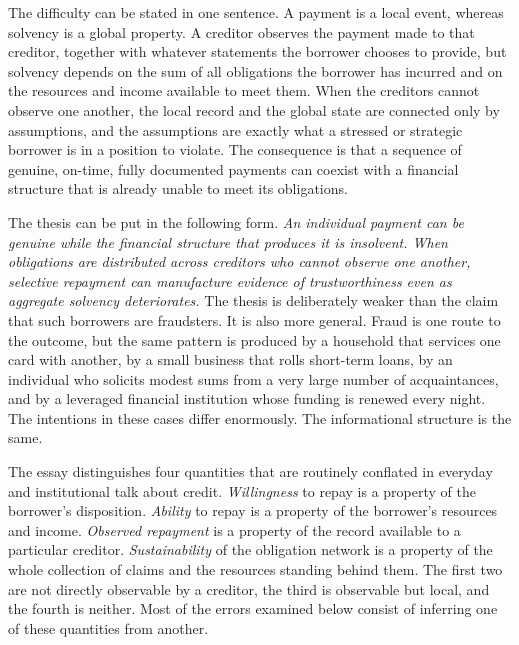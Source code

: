 \documentclass[11pt]{article}
\theoremstyle{definition}
\theoremstyle{remark}
\begin{document}
The difficulty can be stated in one sentence. A payment is a local event, whereas solvency is a global property. A creditor observes the payment made to that creditor, together with whatever statements the borrower chooses to provide, but solvency depends on the sum of all obligations the borrower has incurred and on the resources and income available to meet them. When the creditors cannot observe one another, the local record and the global state are connected only by assumptions, and the assumptions are exactly what a stressed or strategic borrower is in a position to violate. The consequence is that a sequence of genuine, on-time, fully documented payments can coexist with a financial structure that is already unable to meet its obligations.

The thesis can be put in the following form. \emph{An individual payment can be genuine while the financial structure that produces it is insolvent. When obligations are distributed across creditors who cannot observe one another, selective repayment can manufacture evidence of trustworthiness even as aggregate solvency deteriorates.} The thesis is deliberately weaker than the claim that such borrowers are fraudsters. It is also more general. Fraud is one route to the outcome, but the same pattern is produced by a household that services one card with another, by a small business that rolls short-term loans, by an individual who solicits modest sums from a very large number of acquaintances, and by a leveraged financial institution whose funding is renewed every night. The intentions in these cases differ enormously. The informational structure is the same.

The essay distinguishes four quantities that are routinely conflated in everyday and institutional talk about credit. \emph{Willingness} to repay is a property of the borrower's disposition. \emph{Ability} to repay is a property of the borrower's resources and income. \emph{Observed repayment} is a property of the record available to a particular creditor. \emph{Sustainability} of the obligation network is a property of the whole collection of claims and the resources standing behind them. The first two are not directly observable by a creditor, the third is observable but local, and the fourth is neither. Most of the errors examined below consist of inferring one of these quantities from another.
\end{document}
